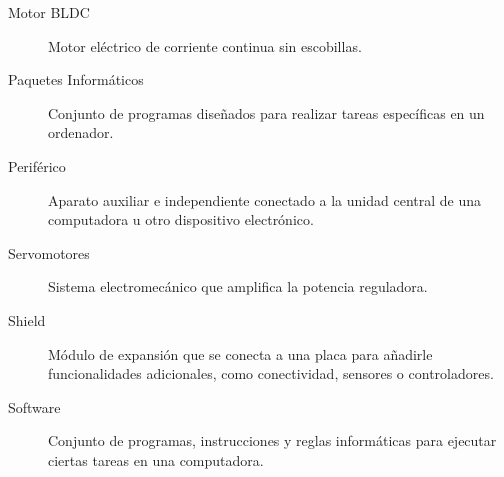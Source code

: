 \begin{description}
    \item[Motor BLDC] Motor eléctrico de corriente continua sin escobillas.
    \item[Paquetes Informáticos] Conjunto de programas diseñados para realizar tareas específicas en un ordenador.
    \item[Periférico] Aparato auxiliar e independiente conectado a la unidad central de una computadora u otro dispositivo electrónico.
    \item[Servomotores] Sistema electromecánico que amplifica la potencia reguladora.
    \item[Shield] Módulo de expansión que se conecta a una placa para añadirle funcionalidades adicionales, como conectividad, sensores o controladores.
    \item[Software] Conjunto de programas, instrucciones y reglas informáticas para ejecutar ciertas tareas en una computadora.
\end{description}

